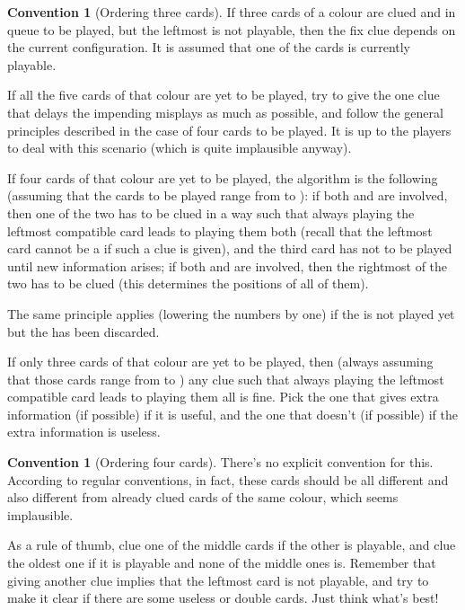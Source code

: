 \documentclass[a4paper]{article}
\theoremstyle{plain}
\theoremstyle{definition}
\newtheorem{convention}[theorem]{Convention}
\begin{document}
\begin{convention}[Ordering three cards]
	\label{ordering-three-cards}
	If three cards of a colour are clued and in queue to be played, but the leftmost is not playable, then the fix clue depends on the current configuration. It is assumed that one of the cards is currently playable.
	
	If all the five cards of that colour are yet to be played, try to give the one clue that delays the impending misplays as much as possible, and follow the general principles described in the case of four cards to be played. It is up to the players to deal with this scenario (which is quite implausible anyway).
	
	If four cards of that colour are yet to be played, the algorithm is the following (assuming that the cards to be played range from  to ): if both  and  are involved, then one of the two has to be clued in a way such that always playing the leftmost compatible card leads to playing them both (recall that the leftmost card cannot be a  if such a clue is given), and the third card has not to be played until new information arises; if both  and  are involved, then the rightmost of the two has to be clued (this determines the positions of all of them).
	
	The same principle applies (lowering the numbers by one) if the  is not played yet but the  has been discarded.
	
	If only three cards of that colour are yet to be played, then (always assuming that those cards range from  to ) any clue such that always playing the leftmost compatible card leads to playing them all is fine. Pick the one that gives extra information (if possible) if it is useful, and the one that doesn't (if possible) if the extra information is useless.
\end{convention}


\begin{convention}[Ordering four cards]
	There's no explicit convention for this. According to regular conventions, in fact, these cards should be all different and also different from already clued cards of the same colour, which seems implausible.
	
	As a rule of thumb, clue one of the middle cards if the other is playable, and clue the oldest one if it is playable and none of the middle ones is. Remember that giving another clue implies that the leftmost card is not playable, and try to make it clear if there are some useless or double cards. Just think what's best!
\end{convention}
\end{document}
